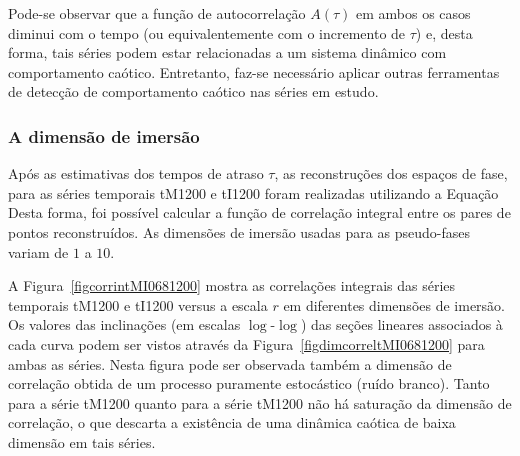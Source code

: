 Pode-se observar que a função de autocorrelação $A(\tau)$ em ambos os casos diminui com o tempo (ou equivalentemente com o incremento de $\tau$) e, desta forma, tais séries podem estar relacionadas a um sistema dinâmico com comportamento caótico. Entretanto, faz-se necessário aplicar outras ferramentas de detecção de comportamento caótico nas séries em estudo.

\subsubsection{A dimensão de imersão}

Após as estimativas dos tempos de atraso $\tau$, as reconstruções dos espaços de fase, para as séries temporais tM1200 e tI1200 foram realizadas utilizando a Equação%
Desta forma, foi possível calcular a função de correlação integral%
entre os pares de pontos reconstruídos. As dimensões de imersão usadas para as pseudo-fases variam de $1$ a $10$. 

A Figura~\ref{figcorrintMI0681200} mostra as correlações integrais das séries temporais tM1200 e tI1200 versus a escala $r$ em diferentes dimensões de imersão. Os valores das inclinações (em escalas $\log$-$\log$) das seções lineares associados à cada curva podem ser vistos através da Figura~\ref{figdimcorreltMI0681200} para ambas as séries. Nesta figura pode ser observada também a dimensão de correlação obtida de um processo puramente estocástico (ruído branco). Tanto para a série tM1200 quanto para a série tM1200 não há saturação da dimensão de correlação, o que descarta a existência de uma dinâmica caótica de baixa dimensão em tais séries. 

